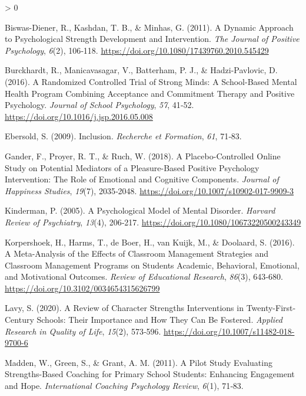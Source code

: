 \documentclass[
  french,
]{article}
\newlength{\cslhangindent}
\newenvironment{CSLReferences}[2] %
 {%
  \setlength{\parindent}{0pt}
  \ifodd #1 \everypar{\setlength{\hangindent}{\cslhangindent}}\ignorespaces\fi
  \ifnum #2 > 0
  \setlength{\parskip}{#2\baselineskip}
  \fi
 }%
 {}
\begin{document}
\hypertarget{refs}{}
\begin{CSLReferences}{1}{0}
\leavevmode\hypertarget{ref-biswas-diener2011}{}%
Biswas-Diener, R., Kashdan, T. B., \& Minhas, G. (2011). A Dynamic Approach to Psychological Strength Development and Intervention. \emph{The Journal of Positive Psychology}, \emph{6}(2), 106‑118. \url{https://doi.org/10.1080/17439760.2010.545429}

\leavevmode\hypertarget{ref-burckhardt2016}{}%
Burckhardt, R., Manicavasagar, V., Batterham, P. J., \& Hadzi-Pavlovic, D. (2016). A Randomized Controlled Trial of Strong Minds: {A} School-Based Mental Health Program Combining Acceptance and Commitment Therapy and Positive Psychology. \emph{Journal of School Psychology}, \emph{57}, 41‑52. \url{https://doi.org/10.1016/j.jsp.2016.05.008}

\leavevmode\hypertarget{ref-ebersold2009}{}%
Ebersold, S. (2009).{} {Inclusion}{}. \emph{Recherche et Formation}, \emph{61}, 71‑83.

\leavevmode\hypertarget{ref-gander2018}{}%
Gander, F., Proyer, R. T., \& Ruch, W. (2018). A {Placebo}-{Controlled Online Study} on {Potential Mediators} of a {Pleasure}-{Based Positive Psychology Intervention}: {The Role} of {Emotional} and {Cognitive Components}. \emph{Journal of Happiness Studies}, \emph{19}(7), 2035‑2048. \url{https://doi.org/10.1007/s10902-017-9909-3}

\leavevmode\hypertarget{ref-kinderman2005}{}%
Kinderman, P. (2005). A Psychological Model of Mental Disorder. \emph{Harvard Review of Psychiatry}, \emph{13}(4), 206‑217. \url{https://doi.org/10.1080/10673220500243349}

\leavevmode\hypertarget{ref-korpershoek2016}{}%
Korpershoek, H., Harms, T., de Boer, H., van Kuijk, M., \& Doolaard, S. (2016). A {Meta}-{Analysis} of the {Effects} of {Classroom Management Strategies} and {Classroom Management Programs} on {Students Academic}, {Behavioral}, {Emotional}, and {Motivational Outcomes}. \emph{Review of Educational Research}, \emph{86}(3), 643‑680. \url{https://doi.org/10.3102/0034654315626799}

\leavevmode\hypertarget{ref-lavy2020}{}%
Lavy, S. (2020). A {Review} of {Character Strengths Interventions} in {Twenty}-{First}-{Century Schools}: Their {Importance} and {How} They Can Be {Fostered}. \emph{Applied Research in Quality of Life}, \emph{15}(2), 573‑596. \url{https://doi.org/10.1007/s11482-018-9700-6}

\leavevmode\hypertarget{ref-madden2011}{}%
Madden, W., Green, S., \& Grant, A. M. (2011). A Pilot Study Evaluating Strengths-Based Coaching for Primary School Students: {Enhancing} Engagement and Hope. \emph{International Coaching Psychology Review}, \emph{6}(1), 71‑83.


\end{CSLReferences}
\end{document}
